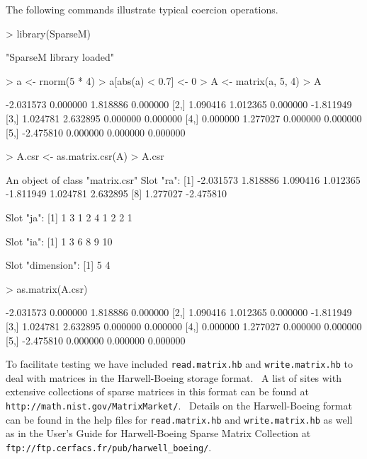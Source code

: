 \documentclass{article}
\begin{document}
The following commands illustrate typical coercion operations.

\begin{Schunk}
\begin{Sinput}
> library(SparseM)
\end{Sinput}
\begin{Soutput}
[1] "SparseM library loaded"
\end{Soutput}
\begin{Sinput}
> a <- rnorm(5 * 4)
> a[abs(a) < 0.7] <- 0
> A <- matrix(a, 5, 4)
> A
\end{Sinput}
\begin{Soutput}
          [,1]     [,2]     [,3]      [,4]
[1,] -2.031573 0.000000 1.818886  0.000000
[2,]  1.090416 1.012365 0.000000 -1.811949
[3,]  1.024781 2.632895 0.000000  0.000000
[4,]  0.000000 1.277027 0.000000  0.000000
[5,] -2.475810 0.000000 0.000000  0.000000
\end{Soutput}
\begin{Sinput}
> A.csr <- as.matrix.csr(A)
> A.csr
\end{Sinput}
\begin{Soutput}
An object of class "matrix.csr"
Slot "ra":
[1] -2.031573  1.818886  1.090416  1.012365 -1.811949  1.024781  2.632895
[8]  1.277027 -2.475810

Slot "ja":
[1] 1 3 1 2 4 1 2 2 1

Slot "ia":
[1]  1  3  6  8  9 10

Slot "dimension":
[1] 5 4
\end{Soutput}
\begin{Sinput}
> as.matrix(A.csr)
\end{Sinput}
\begin{Soutput}
          [,1]     [,2]     [,3]      [,4]
[1,] -2.031573 0.000000 1.818886  0.000000
[2,]  1.090416 1.012365 0.000000 -1.811949
[3,]  1.024781 2.632895 0.000000  0.000000
[4,]  0.000000 1.277027 0.000000  0.000000
[5,] -2.475810 0.000000 0.000000  0.000000
\end{Soutput}
\end{Schunk}
To facilitate testing we have included \texttt{read.matrix.hb} 
and \texttt{write.matrix.hb} to deal with matrices
in the Harwell-Boeing storage format.  \ A list of sites with
extensive collections of sparse matrices  in this format can be found at
\texttt{http://math.nist.gov/MatrixMarket/}. \ Details on the Harwell-Boeing format can
be found in the help files for \texttt{read.matrix.hb} and \texttt{write.matrix.hb} as well
as in the User's Guide for Harwell-Boeing Sparse Matrix Collection at
\texttt{ftp://ftp.cerfacs.fr/pub/harwell\_boeing/}.
\end{document}

